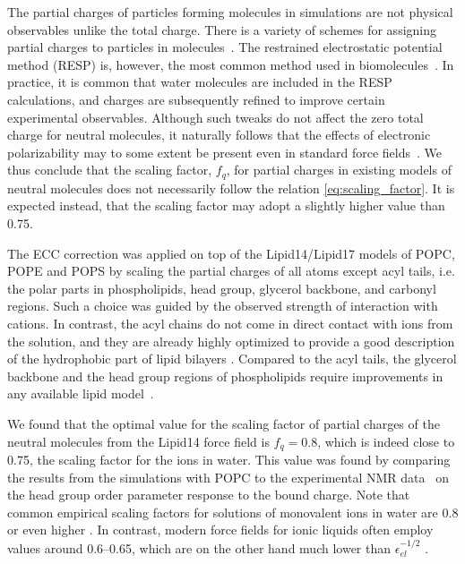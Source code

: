 The partial charges of particles forming molecules in simulations are not physical observables unlike the total charge. 
There is a variety of schemes for assigning partial charges to particles in molecules~\citep{Hu2007}. 
The restrained electrostatic potential method (RESP) is, however, the most common method used in biomolecules~\citep{RESP_paper, Singh1984, dickson14}. 
In practice, it is common that water molecules are included in the RESP calculations, 
and charges are subsequently refined to improve certain experimental observables. 
Although such tweaks do not affect the zero total charge for neutral molecules,
it naturally follows that the effects of electronic polarizability 
may to some extent be present even in standard force fields~\citep{RESP_paper, Singh1984, jorgensen96, ipolq2013, benavides17}. 
We thus conclude that the scaling factor, $f_q$, for partial charges in existing models of neutral molecules does not necessarily follow the relation \ref{eq:scaling_factor}.
It is expected instead, that the scaling factor may adopt a slightly higher value than 0.75. 

The ECC correction was applied on top of the Lipid14/Lipid17 models of POPC, POPE and POPS
by scaling the partial charges of all atoms except acyl tails, 
i.e. the polar parts in phospholipids, head group, glycerol backbone, and carbonyl regions. 
Such a choice was guided by the observed strength of interaction with cations. 
In contrast, the acyl chains do not come in direct contact with ions from the solution, 
and they are already highly optimized to provide a good description of the
hydrophobic part of lipid bilayers \cite{dickson14,ollila16}.
Compared to the acyl tails, the glycerol backbone and the head group regions of phospholipids 
require improvements in any available lipid model~\cite{botan15}.

We found that the optimal value for the scaling factor of partial charges of the neutral molecules from the Lipid14 force field \citep{dickson14}
is $f_q = 0.8$, which is indeed close to 0.75, 
the scaling factor for the ions in water. 
This value was found by comparing the results from the simulations with POPC to the experimental 
NMR data~\cite{akutsu81,altenbach84,scherer89} on the head group order parameter response to the bound charge.
Note that common empirical scaling factors for solutions of monovalent ions in water 
are 0.8 or even higher \citep{benavides17,skinner14,nacleps}.  
In contrast, modern force fields for ionic liquids often employ values around 0.6--0.65, 
which are on the other hand much lower than $\epsilon^{-1/2}_{el}$ \citep{holm14}.

